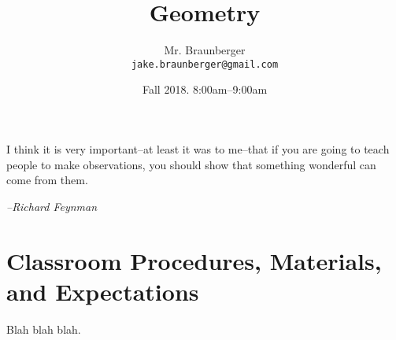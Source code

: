 \documentclass[11pt,article,oneside]{memoir}
\begin{document}
\title{\LARGE Geometry}
\author{\Large Mr. Braunberger \newline \\ \footnotesize\texttt{\noindent jake.braunberger@gmail.com}}
\date{\hspace*{2.4cm}Fall 2018. \newline \noindent \hspace*{-1.6cm} 8:00am--9:00am}

\setlength{\epigraphwidth}{.8\textwidth}

\maketitle

\epigraph{I think it is very important--at least it was to me--that if you are going to teach people to make observations, you should show that something wonderful can come from them.}{\textit{--Richard Feynman}}

\chapter{Classroom Procedures, Materials, and Expectations}

Blah blah blah.
\end{document}
